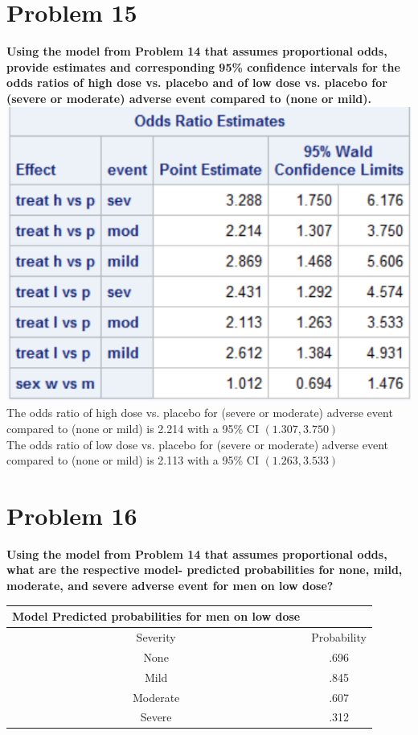 \documentclass{article}
\begin{document}
\begin{flushleft}
\section*{Problem 15}
\textbf{Using the model from Problem 14 that assumes proportional odds, provide estimates and
corresponding 95\% confidence intervals for the odds ratios of high dose vs. placebo and of low dose
vs. placebo for (severe or moderate) adverse event compared to (none or mild).}\medbreak
\includegraphics[scale=.6]{partial.png}\\
The odds ratio of high dose vs. placebo for (severe or moderate) adverse event compared to (none or mild) is 2.214 with a 95\% CI $(1.307, 3.750 )$\\
The odds ratio of low dose vs. placebo for (severe or moderate) adverse event compared to (none or mild) is 2.113 with a 95\% CI $(1.263, 3.533)$
\pagebreak
\section*{Problem 16}
\textbf{Using the model from Problem 14 that assumes proportional odds, what are the respective model-
predicted probabilities for none, mild, moderate, and severe adverse event for men on low dose?}\medbreak

\begin{tabular}{|cc|}
	\hline
	Model Predicted probabilities for men on low dose&\\
	\hline
	Severity & Probability\\
	\hline
	None & .696\\
	\hline
	Mild & .845\\
	\hline
	Moderate & .607\\
	\hline
	Severe & .312\\
	\hline
\end{tabular}
\pagebreak

\end{flushleft}
\end{document}
